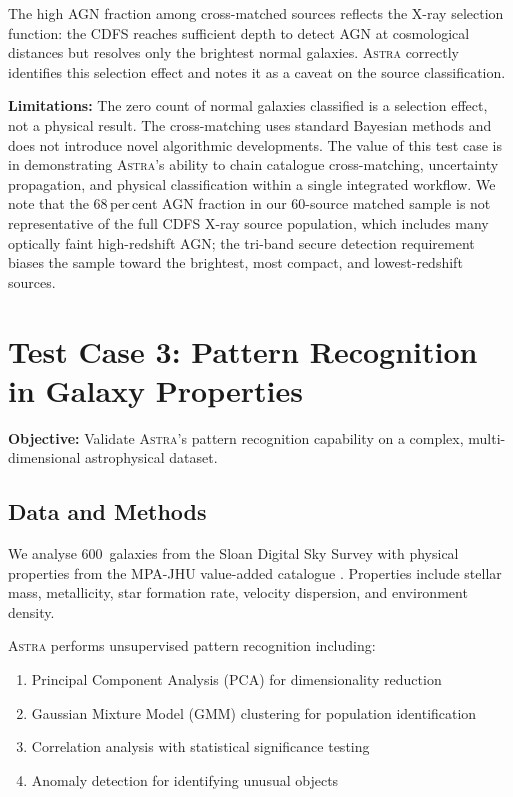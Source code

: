 \documentclass[usenatbib]{rasti}
\newcommand{\astra}{\textsc{Astra}\xspace}
\begin{document}
The high AGN fraction among cross-matched sources reflects the X-ray selection function: the CDFS reaches sufficient depth to detect AGN at cosmological distances but resolves only the brightest normal galaxies.
\astra correctly identifies this selection effect and notes it as a caveat on the source classification.

\textbf{Limitations:} The zero count of normal galaxies classified is a selection effect, not a physical result.
The cross-matching uses standard Bayesian methods and does not introduce novel algorithmic developments.
The value of this test case is in demonstrating \astra's ability to chain catalogue cross-matching, uncertainty propagation, and physical classification within a single integrated workflow.
We note that the 68\,per\,cent AGN fraction in our 60-source matched sample is not representative of the full CDFS X-ray source population, which includes many optically faint high-redshift AGN; the tri-band secure detection requirement biases the sample toward the brightest, most compact, and lowest-redshift sources.

\section{Test Case 3: Pattern Recognition in Galaxy Properties}
\label{sec:tc3}

\textbf{Objective:} Validate \astra's pattern recognition capability on a complex, multi-dimensional astrophysical dataset.

\subsection{Data and Methods}
\label{sec:tc3:data}

We analyse 600~galaxies from the Sloan Digital Sky Survey \citep[SDSS;][]{Abazajian2009} with physical properties from the MPA-JHU value-added catalogue \citep{Brinchmann2004}.
Properties include stellar mass, metallicity, star formation rate, velocity dispersion, and environment density.

\astra performs unsupervised pattern recognition including:
\begin{enumerate}
  \item[(i)] Principal Component Analysis (PCA) for dimensionality reduction
  \item[(ii)] Gaussian Mixture Model (GMM) clustering for population identification
  \item[(iii)] Correlation analysis with statistical significance testing
  \item[(iv)] Anomaly detection for identifying unusual objects
\end{enumerate}
\end{document}
